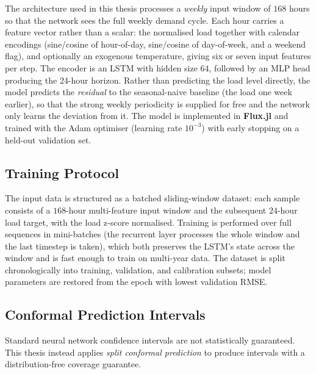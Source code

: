 The architecture used in this thesis processes a \emph{weekly} input window of $168$ hours so that the network sees the full weekly demand cycle. Each hour carries a feature vector rather than a scalar: the normalised load together with calendar encodings (sine/cosine of hour-of-day, sine/cosine of day-of-week, and a weekend flag), and optionally an exogenous temperature, giving six or seven input features per step. The encoder is an LSTM with hidden size $64$, followed by an MLP head producing the 24-hour horizon. Rather than predicting the load level directly, the model predicts the \emph{residual} to the seasonal-naive baseline (the load one week earlier), so that the strong weekly periodicity is supplied for free and the network only learns the deviation from it. The model is implemented in \textbf{Flux.jl} \cite{innes2018flux} and trained with the Adam optimiser \cite{kingma2014adam} (learning rate $10^{-3}$) with early stopping on a held-out validation set.

\subsection{Training Protocol}

The input data is structured as a batched sliding-window dataset: each sample consists of a $168$-hour multi-feature input window and the subsequent $24$-hour load target, with the load z-score normalised. Training is performed over full sequences in mini-batches (the recurrent layer processes the whole window and the last timestep is taken), which both preserves the LSTM's state across the window and is fast enough to train on multi-year data. The dataset is split chronologically into training, validation, and calibration subsets; model parameters are restored from the epoch with lowest validation RMSE.

\subsection{Conformal Prediction Intervals}

Standard neural network confidence intervals are not statistically guaranteed. This thesis instead applies \emph{split conformal prediction} \cite{angelopoulos2022conformal} to produce intervals with a distribution-free coverage guarantee.

